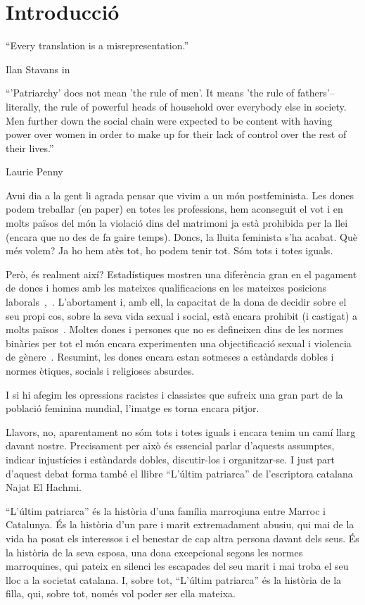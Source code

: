 \section{Introducció}

\epigraph{``Every translation is a misrepresentation.''}{Ilan Stavans in~\autocite{Albin2005}}
\epigraph{``'Patriarchy' does not mean 'the rule of men'. It means 'the rule of fathers'--literally, the rule of powerful heads of household over everybody else in society. Men further down the social chain were expected to be content with having power over women in order to make up for their lack of control over the rest of their lives.''}{Laurie Penny~\autocite[69]{Penny2014}}

Avui dia a la gent li agrada pensar que vivim a un món postfeminista.
Les dones podem treballar (en paper) en totes les professions, hem aconseguit el vot i en molts països del món la violació dins del matrimoni ja està prohibida per la llei (encara que no des de fa gaire temps).
Doncs, la lluita feminista s'ha acabat.
Què més volem?
Ja ho hem atès tot, ho podem tenir tot.
Sóm tots i totes iguals.

Però, és realment així?
Estadístiques mostren una diferència gran en el pagament de dones i homes amb les mateixes qualificacions en les mateixes posicions laborals~\autocite{EU2014},~\autocite{MDBGH2012}.
L'abortament i, amb ell, la capacitat de la dona de decidir sobre el seu propi cos, sobre la seva vida sexual i social, està encara prohibit (i castigat) a molts països~\autocite{UN2013}.
Moltes dones i persones que no es defineixen dins de les normes binàries per tot el món encara experimenten una objectificació sexual i violencia de gènere~\autocite{WHO2016}.
Resumint, les dones encara estan sotmeses a estàndards dobles i normes ètiques, socials i religioses absurdes.

I si hi afegim les opressions racistes i classistes que sufreix una gran part de la població feminina mundial, l'imatge es torna encara pitjor.

Llavors, no, aparentament no sóm tots i totes iguals i encara tenim un camí llarg davant nostre.
Precisament per això és essencial parlar d'aquests assumptes, indicar injustícies i estàndards dobles, discutir-los i organitzar-se.
I just part d'aquest debat forma també el llibre ``L'últim patriarca'' de l'escriptora catalana Najat El Hachmi.

``L'últim patriarca'' és la història d'una família marroqiuna entre Marroc i Catalunya.
És la història d'un pare i marit extremadament abusiu, qui mai de la vida ha posat els interessos i el benestar de cap altra persona davant dels seus.
És la història de la seva esposa, una dona excepcional segons les normes marroquines, qui pateix en silenci les escapades del seu marit i mai troba el seu lloc a la societat catalana.
I, sobre tot, ``L'últim patriarca'' és la història de la filla, qui, sobre tot, només vol poder ser ella mateixa.

